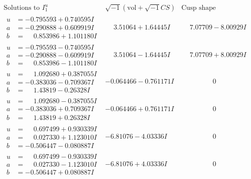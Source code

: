 \documentclass[1p]{elsarticle_modified}
\theoremstyle{definition}
\newcommand{\I}{\sqrt{-1}}
\begin{document}
$$\begin{array}{c|c|c}  
\text{Solutions to }I^u_{1}& \I (\text{vol} + \sqrt{-1}CS) & \text{Cusp shape}\\
 \hline 
\begin{aligned}
u &= -0.795593 + 0.740595 I \\
a &= -0.290888 + 0.609919 I \\
b &= \phantom{-}0.853986 + 1.101180 I\end{aligned}
 & \phantom{-}3.51064 + 1.64445 I & \phantom{-}7.07709 - 8.00929 I \\ \hline\begin{aligned}
u &= -0.795593 - 0.740595 I \\
a &= -0.290888 - 0.609919 I \\
b &= \phantom{-}0.853986 - 1.101180 I\end{aligned}
 & \phantom{-}3.51064 - 1.64445 I & \phantom{-}7.07709 + 8.00929 I \\ \hline\begin{aligned}
u &= \phantom{-}1.092680 + 0.387055 I \\
a &= -0.383036 - 0.709367 I \\
b &= \phantom{-}1.43819 - 0.26328 I\end{aligned}
 & -0.064466 - 0.761171 I & \phantom{-0.000000 } 0 \\ \hline\begin{aligned}
u &= \phantom{-}1.092680 - 0.387055 I \\
a &= -0.383036 + 0.709367 I \\
b &= \phantom{-}1.43819 + 0.26328 I\end{aligned}
 & -0.064466 + 0.761171 I & \phantom{-0.000000 } 0 \\ \hline\begin{aligned}
u &= \phantom{-}0.697499 + 0.930339 I \\
a &= \phantom{-}0.027330 + 1.123010 I \\
b &= -0.506447 - 0.080887 I\end{aligned}
 & -6.81076 - 4.03336 I & \phantom{-0.000000 } 0 \\ \hline\begin{aligned}
u &= \phantom{-}0.697499 - 0.930339 I \\
a &= \phantom{-}0.027330 - 1.123010 I \\
b &= -0.506447 + 0.080887 I\end{aligned}
 & -6.81076 + 4.03336 I & \phantom{-0.000000 } 0 \\ \hline\begin{aligned}

\end{aligned}
\end{array}$$
\end{document}
